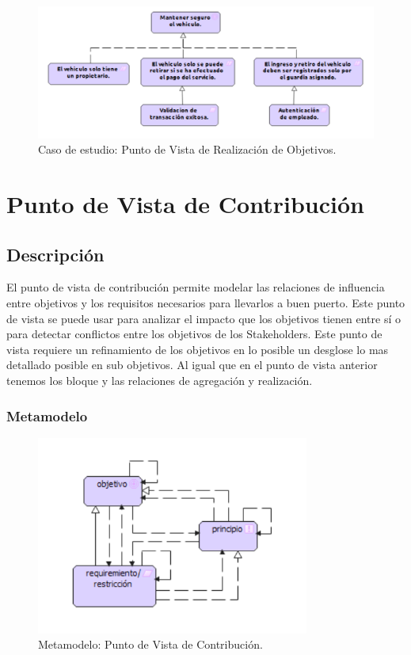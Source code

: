 \begin{figure}[h]
	\centering
	\includegraphics[width=1.0\textwidth]{imagenes/Caso_Estudio/Motivacion/Realizacion_Objetivos.PDF}
	\caption{Caso de estudio: Punto de Vista de Realización de Objetivos.}
	\label{fig:gap_analysis}
\end{figure}

\section{Punto de Vista de Contribución}
\subsection{Descripción}
El punto de vista de contribución permite modelar las relaciones de influencia entre objetivos y los requisitos necesarios para llevarlos a buen puerto. Este punto de vista se puede usar para analizar el impacto que los objetivos tienen entre sí o para detectar conflictos entre los objetivos de los Stakeholders. Este punto de vista requiere un refinamiento de los objetivos en lo posible un desglose lo mas detallado posible en sub objetivos. Al igual que en el punto de vista anterior tenemos los bloque y las relaciones de agregación y realización.

\subsubsection{Metamodelo}
\begin{figure}[h]
	\centering
	\includegraphics[width=0.8\textwidth]{imagenes/Metamodelos/Motivacion/meta_Contribucion.pdf}
	\caption{Metamodelo: Punto de Vista de Contribución.}
	\label{fig:gap_analysis}
\end{figure}

